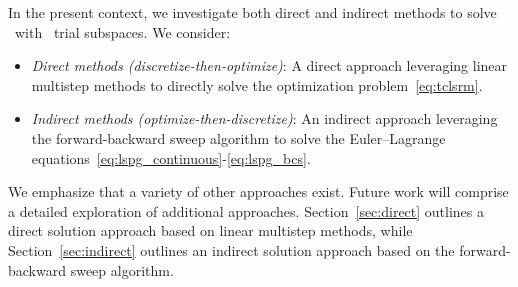 In the present context, we investigate both direct and indirect methods to solve \methodAcronym\ with \spatialAcronym\ trial
subspaces. We consider: 
\begin{itemize} \item \textit{Direct methods (discretize-then-optimize)}: A direct approach leveraging linear multistep methods to directly solve the optimization problem~\eqref{eq:tclsrm}.
\item \textit{Indirect methods (optimize-then-discretize)}: An indirect approach leveraging the forward-backward sweep algorithm to solve the Euler--Lagrange equations~\eqref{eq:lspg_continuous}-\eqref{eq:lspg_bcs}.

\end{itemize} 
We emphasize that a variety of other approaches exist. Future work will comprise a detailed exploration
of additional approaches.
Section~\ref{sec:direct} outlines a direct solution approach based on linear
multistep methods, while Section~\ref{sec:indirect} outlines an indirect
solution approach based on the forward-backward sweep algorithm. 





